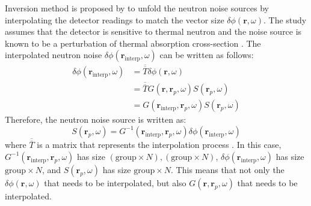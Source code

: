 Inversion method is proposed by \cite{demaziereIdentificationLocalizationAbsorbers2005} to unfold the neutron noise sources by interpolating the detector readings to match the vector size $\delta \phi (\textbf{r}, \omega)$. The study assumes that the detector is sensitive to thermal neutron and the noise source is known to be a perturbation of thermal absorption cross-section \cite{demaziereIdentificationLocalizationAbsorbers2005}. The interpolated neutron noise $\delta \phi (\textbf{r}_{\text{interp}}, \omega)$ can be written as follows:
\begin{equation}
    \begin{aligned}
        \delta \phi (\textbf{r}_{\text{interp}}, \omega) &= \overline{\overline{T}} \delta \phi (\textbf{r}, \omega) \\
        &= \overline{\overline{T}} G(\textbf{r}, \textbf{r}_p,\omega) S(\textbf{r}_p,\omega) \\
        &= G(\textbf{r}_{\text{interp}}, \textbf{r}_p,\omega) S(\textbf{r}_p,\omega)
    \end{aligned}
\end{equation}
Therefore, the neutron noise source is written as:
\begin{equation}
    S(\textbf{r}_p,\omega) = G^{-1}(\textbf{r}_{\text{interp}}, \textbf{r}_p,\omega) \delta \phi (\textbf{r}_{\text{interp}}, \omega)
\end{equation}
where $\overline{\overline{T}}$ is a matrix that represents the interpolation process \cite{demaziereIdentificationLocalizationAbsorbers2005}. In this case, $G^{-1}(\textbf{r}_{\text{interp}}, \textbf{r}_p,\omega)$ has size $(\text{group} \times N), (\text{group} \times  N)$, $\delta \phi (\textbf{r}_{\text{interp}}, \omega)$ has size $\text{group} \times N$, and $S(\textbf{r}_p,\omega)$ has size $\text{group} \times N$. This means that not only the $\delta \phi (\textbf{r}, \omega)$ that needs to be interpolated, but also $G(\textbf{r}, \textbf{r}_p,\omega)$ that needs to be interpolated.


